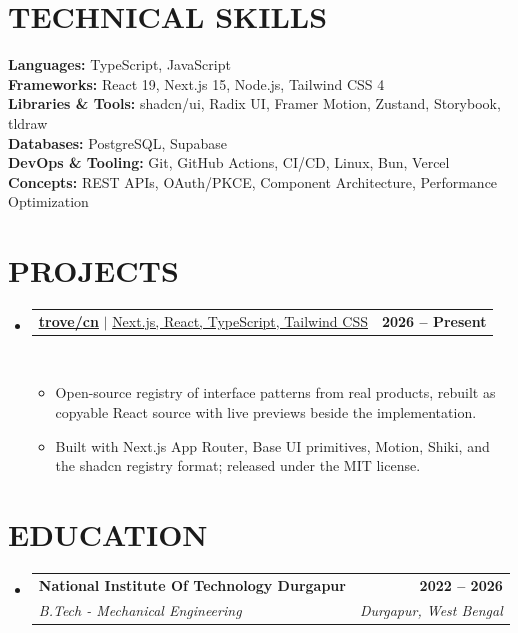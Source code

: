 \documentclass[letterpaper, 10pt]{article}
\makeatletter
\newcommand{\resumeItem}[1]{ \item\small{ {#1 \vspace{-3pt}} } }
\newcommand{\resumeSubheading}[4]{
\vspace{2pt}
\item
\begin{tabular*}{1.0\textwidth}[t]{l@{\extracolsep{\fill}}r}
  \textbf{#1} & \textbf{\small #2} \\
  \textit{\small#3} & \textit{\small #4} \\
\end{tabular*}
\vspace{-5pt}
}
\newcommand{\resumeProjectHeading}[2]{ \item
\begin{tabular*}{1.001\textwidth}{l@{\extracolsep{\fill}}r}
  \small#1 & \textbf{\small #2} \\
\end{tabular*}
\vspace{-7pt}
}
\newcommand{\resumeSubHeadingListStart}{\begin{itemize}[leftmargin=0.0in, label={}]}
\newcommand{\resumeSubHeadingListEnd}{\end{itemize}}
\newcommand{\resumeItemListStart}{\begin{itemize}
\vspace{-3pt}}
\newcommand{\resumeItemListEnd}{\end{itemize}
\vspace{-5pt}}
\makeatother
\begin{document}
  \section{TECHNICAL SKILLS}
  \begin{itemize}[leftmargin=0.15in, label={}]
    \small{\item{ \textbf{\normalsize{Languages:}}{ \normalsize{TypeScript, JavaScript}} \\ \textbf{\normalsize{Frameworks:}}{ \normalsize{React 19, Next.js 15, Node.js, Tailwind CSS 4}} \\ \textbf{\normalsize{Libraries \& Tools:}}{ \normalsize{shadcn/ui, Radix UI, Framer Motion, Zustand, Storybook, tldraw}} \\ \textbf{\normalsize{Databases:}}{ \normalsize{PostgreSQL, Supabase}} \\ \textbf{\normalsize{DevOps \& Tooling:}}{ \normalsize{Git, GitHub Actions, CI/CD, Linux, Bun, Vercel}} \\ \textbf{\normalsize{Concepts:}}{ \normalsize{REST APIs, OAuth/PKCE, Component Architecture, Performance Optimization}} \\ }}
  \end{itemize}
  \vspace{-15pt}

  \section{PROJECTS}
  \vspace{-5pt}
  \resumeSubHeadingListStart \resumeProjectHeading
  {\href{https://trovecn.dev}{\textbf{\underline{trove/cn}}} $|$ \underline{Next.js, React, TypeScript, Tailwind CSS}}{2026 -- Present}\\
  \resumeItemListStart \resumeItem{\normalsize{Open-source registry of interface patterns from real products, rebuilt as copyable React source with live previews beside the implementation.}}
  \resumeItem{\normalsize{Built with Next.js App Router, Base UI primitives, Motion, Shiki, and the shadcn registry format; released under the MIT license.}}
  \resumeItemListEnd \resumeSubHeadingListEnd
  \vspace{-14pt}

  \section{EDUCATION}
  \resumeSubHeadingListStart \resumeSubheading
  {National Institute Of Technology Durgapur}{2022 -- 2026}
  {B.Tech - Mechanical Engineering}{Durgapur, West Bengal}
  \resumeSubHeadingListEnd
\end{document}

